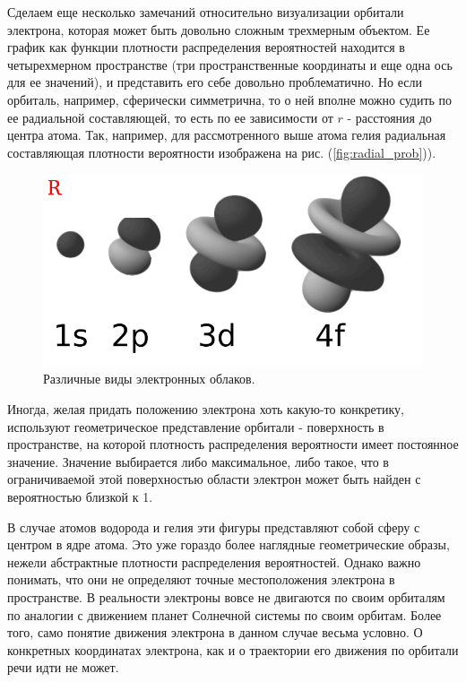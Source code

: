 Сделаем еще несколько замечаний относительно визуализации орбитали электрона, которая может быть довольно сложным трехмерным объектом.
Ее график как функции плотности распределения вероятностей находится в четырехмерном пространстве (три пространственные координаты и еще одна ось для ее значений), и представить его себе довольно проблематично.
Но если орбиталь, например, сферически симметрична, то о ней вполне можно судить по ее радиальной составляющей, то есть по ее зависимости от $r$ - расстояния до центра атома.
Так, например, для рассмотренного выше атома гелия радиальная составляющая плотности вероятности изображена на рис. (\ref{fig:radial_prob})).

\begin{figure}[t!]
   \centering
   \includegraphics[scale=0.9]{images/electron_clouds_1}
   \caption{Различные виды электронных облаков.}
   \label{fig:electron_clouds_1}
\end{figure}

Иногда, желая придать положению электрона хоть какую-то конкретику, используют геометрическое представление орбитали - поверхность в пространстве, на которой плотность распределения вероятности имеет постоянное значение.
Значение выбирается либо максимальное, либо такое, что в ограничиваемой этой поверхностью области электрон может быть найден с вероятностью близкой к 1.

В случае атомов водорода и гелия эти фигуры представляют собой сферу с центром в ядре атома.
Это уже гораздо более наглядные геометрические образы, нежели абстрактные плотности распределения вероятностей.
Однако важно понимать, что они не определяют точные местоположения электрона в пространстве. 
В реальности электроны вовсе не двигаются по своим орбиталям по аналогии с движением планет Солнечной системы по своим орбитам.
Более того, само понятие движения электрона в данном случае весьма условно.
О конкретных координатах электрона, как и о траектории его движения по орбитали речи идти не может.

